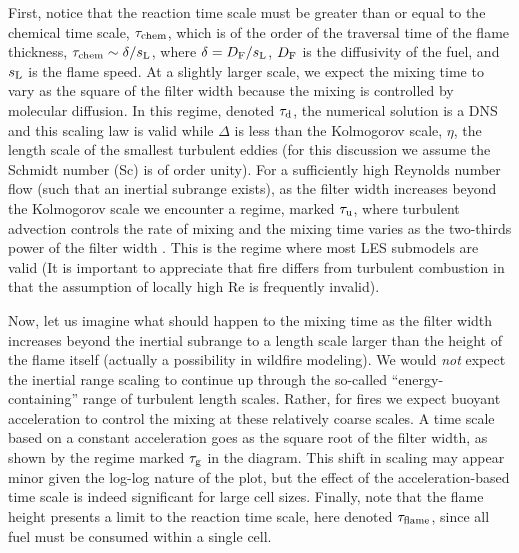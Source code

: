 First, notice that the reaction time scale must be greater than or equal to the chemical time scale, $\tau_{\rm chem}$, which is of the order of the traversal time of the flame thickness, $\tau_{\rm chem} \sim \delta/s_{\rm L}$, where $\delta=D_{\rm F}/s_{\rm L}$, $D_{\rm F}$ is the diffusivity of the fuel, and $s_{\rm L}$ is the flame speed. At a slightly larger scale, we expect the mixing time to vary as the square of the filter width because the mixing is controlled by molecular diffusion.  In this regime, denoted $\tau_{\rm d}$, the numerical solution is a DNS and this scaling law is valid while $\Delta$ is less than the Kolmogorov scale, $\eta$, the length scale of the smallest turbulent eddies (for this discussion we assume the Schmidt number (Sc) is of order unity). For a sufficiently high Reynolds number flow (such that an inertial subrange exists), as the filter width increases beyond the Kolmogorov scale we encounter a regime, marked $\tau_{\rm u}$, where turbulent advection controls the rate of mixing and the mixing time varies as the two-thirds power of the filter width \cite{Pope:2000}.  This is the regime where most LES submodels are valid (It is important to appreciate that fire differs from turbulent combustion in that the assumption of locally high Re is frequently invalid).

Now, let us imagine what should happen to the mixing time as the filter width increases beyond the inertial subrange to a length scale larger than the height of the flame itself (actually a possibility in wildfire modeling). We would \emph{not} expect the inertial range scaling to continue up through the so-called ``energy-containing'' range of turbulent length scales.  Rather, for fires we expect buoyant acceleration to control the mixing at these relatively coarse scales.  A time scale based on a constant acceleration goes as the square root of the filter width, as shown by the regime marked $\tau_{\rm g}$ in the diagram.  This shift in scaling may appear minor given the log-log nature of the plot, but the effect of the acceleration-based time scale is indeed significant for large cell sizes.  Finally, note that the flame height presents a limit to the reaction time scale, here denoted $\tau_{\rm flame}$, since all fuel must be consumed within a single cell.

